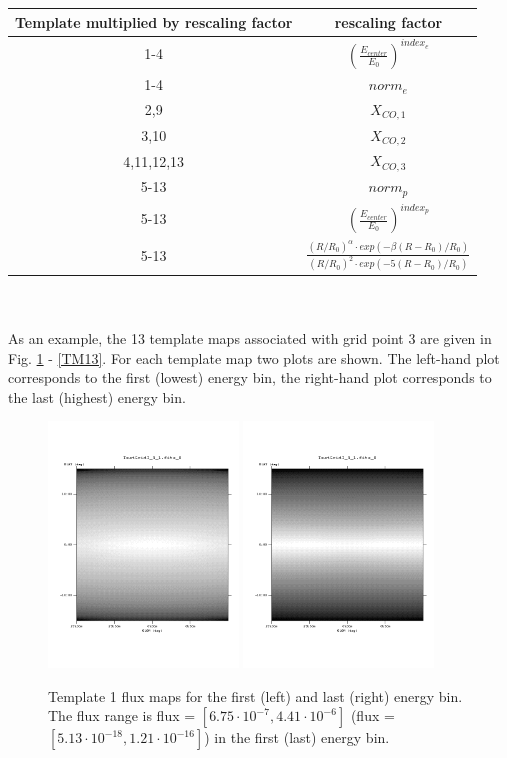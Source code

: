 \documentclass{article}
\begin{document}
\begin{tabular}[h]{c|c}
\hline
Template multiplied by rescaling factor & rescaling factor \\
\hline
1-4 & $\left(\frac{E_{center}}{E_{0}}\right)^{index_e}$ \\
1-4 & $norm_e$ \\
2,9 & $X_{CO,1}$ \\
3,10 & $X_{CO,2}$ \\
4,11,12,13 & $X_{CO,3}$ \\
5-13 & $norm_p$ \\
5-13 & $\left(\frac{E_{center}}{E_{0}}\right)^{index_p}$ \\
5-13 & $\frac{(R/R_{0})^{\alpha} \cdot exp(- \beta (R-R_{0})/R_{0}) }{(R/R_{0})^{2} \cdot exp(- 5 (R-R_{0})/R_{0}) }$ \\
\end{tabular} \\
\\
As an example, the 13 template maps associated with grid point 3 are given in Fig. \ref{TM1} - \ref{TM13}. For each template map two plots are shown. The left-hand plot corresponds to the first (lowest) energy bin, the right-hand plot corresponds to the last (highest) energy bin.
\begin{figure}
\centering
\includegraphics[trim = 50 100 70 100, clip = true, width=0.45\textwidth]{figs/Template_maps/Template1_Ebin01}
\includegraphics[trim = 50 100 70 100, clip = true, width=0.45\textwidth]{figs/Template_maps/Template1_Ebin71}
\caption{Template 1 flux maps for the first (left) and last (right) energy bin. The flux range is flux = $[6.75 \cdot 10^{-7}, 4.41 \cdot 10^{-6}]$ (flux = $[5.13 \cdot 10^{-18}, 1.21 \cdot 10^{-16}]$) in the first (last) energy bin.}
\label{TM1}
\end{figure}
\end{document}
